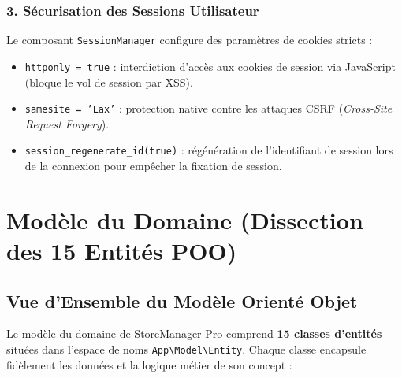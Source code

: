 \documentclass[11pt,a4paper,titlepage,twoside,openright]{report}
\begin{document}
\subsection{3. Sécurisation des Sessions Utilisateur}
Le composant \texttt{SessionManager} configure des paramètres de cookies stricts :
\begin{itemize}
    \item \texttt{httponly = true} : interdiction d'accès aux cookies de session via JavaScript (bloque le vol de session par XSS).
    \item \texttt{samesite = 'Lax'} : protection native contre les attaques CSRF (\emph{Cross-Site Request Forgery}).
    \item \texttt{session\_regenerate\_id(true)} : régénération de l'identifiant de session lors de la connexion pour empêcher la fixation de session.
\end{itemize}

\chapter{Modèle du Domaine (Dissection des 15 Entités POO)}

\section{Vue d'Ensemble du Modèle Orienté Objet}

Le modèle du domaine de StoreManager Pro comprend \textbf{15 classes d'entités} situées dans l'espace de noms \texttt{App\textbackslash Model\textbackslash Entity}. Chaque classe encapsule fidèlement les données et la logique métier de son concept :
\end{document}
